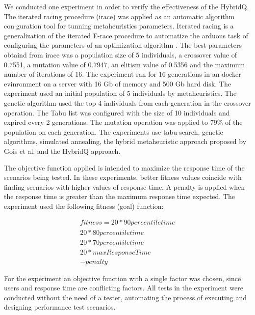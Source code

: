 \documentclass{report}
\begin{document}
We conducted one experiment in order to verify the effectiveness of the HybridQ. The iterated racing procedure (irace) was applied as an automatic algorithm conguration tool for tunning metaheuristics parameters. Iterated racing is a generalization of the iterated F-race procedure to automatize the arduous task of configuring the parameters of an optimization algorithm \cite{ManuelLopez-IbanezJeremieDubois-LacosteLesliePerezCaceresMauroBirattari2016}. The best parameters obtaind from irace was a population size of 5 individuals, a crossover value of 0.7551, a mutation value of 0.7947, an elitism value of 0.5356 and the maximum number of iterations of 16. The experiment ran for 16 generations in an docker evinronment on a server with 16 Gb of memory and 500 Gb hard disk. The experiment used an initial population of 5 individuals by metaheuristics. The genetic algorithm used the top 4 individuals from each generation in the crossover operation. The Tabu list was configured with the size of 10 individuals and expired every 2 generations.  The mutation operation was applied to 79\% of the population on each generation. The experiments use tabu search, genetic algorithms, simulated annealing, the hybrid metaheuristic approach proposed by Gois et al. \cite{Gois2016} and the HybridQ approach. 


The objective function applied is intended to maximize the response time of the scenarios being tested.  In these experiments, better fitness values coincide with finding scenarios with higher values of response time. A penalty is applied when the response time is greater than the  maximum response time expected. The experiment used the following fitness (goal) function:

\begin{equation}
\begin{aligned}
fitness=
20* 90percentiletime\\
20*80percentiletime\\
20*70percentiletime\\
20*maxResponseTime\\
-penalty
\end{aligned}
\end{equation}

For the experiment an objective function with a single factor was chosen, since users and response time are conflicting factors. All tests in the experiment were conducted without the need of a tester, automating the process of executing and designing performance test scenarios.    
\end{document}
